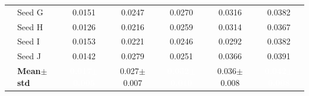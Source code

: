 \begin{table}[H]
{\begin{tabular}{@{}llccccc@{}}
  & Seed G & {\small 0.0151} & {\small 0.0247} & {\small 0.0270} & {\small 0.0316} & {\small 0.0382} \\
  & Seed H & {\small 0.0126} & {\small 0.0216} & {\small 0.0259} & {\small 0.0314} & {\small 0.0367} \\
  & Seed I & {\small 0.0153} & {\small 0.0221} & {\small 0.0246} & {\small 0.0292} & {\small 0.0382} \\
  & Seed J & {\small 0.0142} & {\small 0.0279} & {\small 0.0251} & {\small 0.0366} & {\small 0.0391} \\
 & \textbf{Mean$\pm$std} & \cellcolor{ForestGreen!55}\textcolor{white}{\textbf{0.017$\pm$0.005}} & \cellcolor{ForestGreen!25}0.027$\pm$0.007 & \cellcolor{ForestGreen!55}\textcolor{white}{\textbf{0.032$\pm$0.010}} & \cellcolor{ForestGreen!25}0.036$\pm$0.008 & \cellcolor{ForestGreen!55}\textcolor{white}{\textbf{0.042$\pm$0.008}} \\
\bottomrule
\end{tabular}
}
\end{table}

